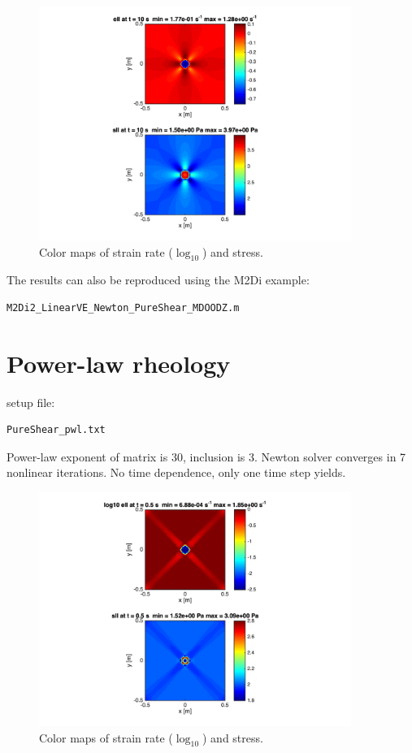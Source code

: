 \documentclass[12pt,english,openany]{scrbook}
\begin{document}
\begin{figure}[ht!]
\centerline{\includegraphics[height=3.0in]{./Figures/PureShear_VE_cmaps}}
\caption{Color maps of strain rate ($\log_{10}$) and stress.}
\label{PureShear_VE_cmapsl}
\end{figure}

The results can also be reproduced using the M2Di example:
\begin{verbatim} 
M2Di2_LinearVE_Newton_PureShear_MDOODZ.m
\end{verbatim}

\section{Power-law rheology}

setup file:
\begin{verbatim} 
PureShear_pwl.txt
\end{verbatim}

Power-law exponent of matrix is 30, inclusion is 3.
Newton solver converges in 7 nonlinear iterations.
No time dependence, only one time step yields.

\begin{figure}[ht!]
\centerline{\includegraphics[height=3.0in]{./Figures/PureShear_pwl_cmaps}}
\caption{Color maps of strain rate ($\log_{10}$) and stress.}
\label{PureShear_pwl_cmaps}
\end{figure}
\end{document}
